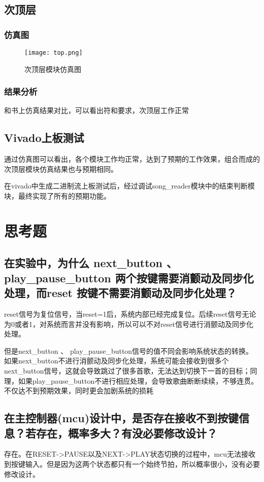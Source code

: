 \documentclass{../source/zjureport}
\begin{document}
    \subsection{次顶层}
        \subsubsection{仿真图}
        \begin{figure}[htp]
            \centering
            \texttt{[image: top.png]}
            \caption{次顶层模块仿真图}
        \end{figure}

        \subsubsection{结果分析}
        和书上仿真结果对比，可以看出符和要求，次顶层工作正常
    
    \subsection{Vivado上板测试}
    通过仿真图可以看出，各个模块工作均正常，达到了预期的工作效果，组合而成的次顶层模块仿真结果也与预期相同。


    在vivado中生成二进制流上板测试后，经过调试song_reader模块中的结束判断模块，最终实现了所有的预期功能。

\section{思考题}
    \subsection{在实验中，为什么 next_button 、 play_pause_button 两个按键需要消颤动及同步化处理，而reset 按键不需要消颤动及同步化处理？}
    reset信号为复位信号，当reset=1后，系统内部已经完成复位。后续reset信号无论为0或者1，对系统而言并没有影响，所以可以不对reset信号进行消颤动及同步化处理。

    但是next_button 、 play_pause_button信号的值不同会影响系统状态的转换。如果next_button不进行消颤动及同步化处理，系统可能会接收到很多个next_button信号，这就会导致跳过了很多首歌，无法达到切换下一首的目标；同理，如果play_pause_button不进行相应处理，会导致歌曲断断续续，不够连贯。不仅达不到预期效果，同时更会加剧系统的损耗

    \subsection{在主控制器(mcu)设计中，是否存在接收不到按键信息？若存在，概率多大？有没必要修改设计？}
    存在。在RESET->PAUSE以及NEXT->PLAY状态切换的过程中，mcu无法接收到按键输入。但是因为这两个状态都只有一个始终节拍，所以概率很小，没有必要修改设计。
\end{document}
